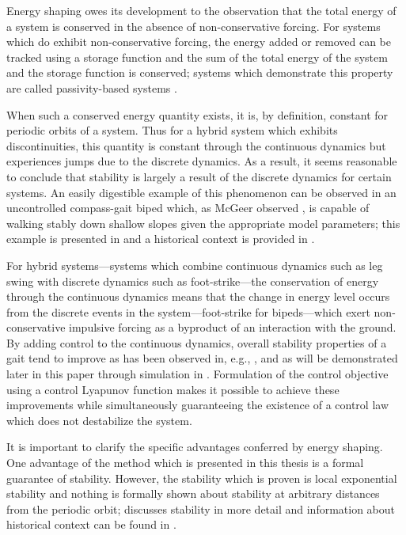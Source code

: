 Energy shaping owes its development to the observation that the total energy of
a system is conserved in the absence of non-conservative forcing.
%
For systems which do exhibit non-conservative forcing, the energy added or
removed can be tracked using a storage function and the sum of the total energy
of the system and the storage function is conserved;
%
systems which demonstrate this property are called passivity-based systems
\cite{Spong2007}.
%

When such a conserved energy quantity exists, it is, by definition, constant for
periodic orbits of a system.
%
Thus for a hybrid system which exhibits discontinuities, this quantity is
constant through the continuous dynamics but experiences jumps due to the
discrete dynamics.
%
As a result, it seems reasonable to conclude that stability is largely a result
of the discrete dynamics for certain systems.
%
An easily digestible example of this phenomenon can be observed in an
uncontrolled compass-gait biped which, as McGeer observed \cite{McGeer1990}, is
capable of walking stably down shallow slopes given the appropriate model
parameters;
%
this example is presented in  and a
historical context is provided in .

For hybrid systems---systems which combine continuous dynamics such as leg
swing with discrete dynamics such as foot-strike---the conservation of energy
through the continuous dynamics means that the change in energy level occurs
from the discrete events in the system---foot-strike for bipeds---which exert
non-conservative impulsive forcing as a byproduct of an interaction with the
ground.
%
By adding control to the continuous dynamics, overall stability properties of a
gait tend to improve as has been observed in, e.g., \cite{Spong2003}, and as will
be demonstrated later in this paper through simulation in
.
%
Formulation of the control objective using a control Lyapunov function makes it
possible to achieve these improvements while simultaneously guaranteeing the
existence of a control law which does not destabilize the system.

It is important to clarify the specific advantages conferred by energy shaping.
%
One advantage of the method which is presented in this thesis is a formal
guarantee of stability.
%
However, the stability which is proven is local exponential stability and
nothing is formally shown about stability at arbitrary distances from the
periodic orbit;  discusses stability in more detail
and information about historical context can be found in
.

